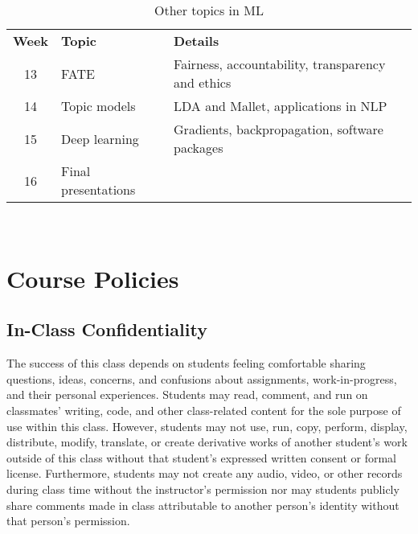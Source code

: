 \documentclass[10pt]{memoir}
\begin{document}
\begin{table}[htb!]
\centering
\begin{tabular}{cll}
     \textbf{Week} & \textbf{Topic} & \textbf{Details}   \\
    \cmidrule[.1em](lr){1-3}
    
     13   & FATE &   Fairness, accountability, transparency and ethics \\
    \cmidrule[.1em](lr){1-3} 
 
     14  & Topic models &  LDA and Mallet, applications in NLP \\
    \cmidrule[.1em](lr){1-3} 

     15  & Deep learning &  Gradients, backpropagation, software packages \\
    \cmidrule[.1em](lr){1-3} 

     16   & Final presentations &   \\
    \cmidrule[.1em](lr){1-3} 
    

\end{tabular}\\
\caption{Other topics in ML}
\end{table}

\clearpage


\section{\textbf{Course Policies}}


\subsection{In-Class Confidentiality}
The success of this class depends on students feeling comfortable sharing questions, ideas, concerns, and confusions about assignments, work-in-progress, and their personal experiences. Students may read, comment, and run on classmates' writing, code, and other class-related content for the sole purpose of use within this class. However, students may not use, run, copy, perform, display, distribute, modify, translate, or create derivative works of another student's work outside of this class without that student's expressed written consent or formal license. Furthermore, students may not create any audio, video, or other records during class time without the instructor's permission nor may students publicly share comments made in class attributable to another person's identity without that person's permission.
\end{document}
